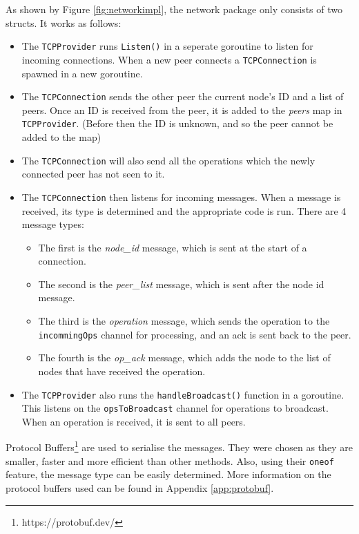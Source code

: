 \documentclass[12pt]{report}
\begin{document}
As shown by Figure \ref{fig:networkimpl}, the network package only consists of two structs. It works as follows: 
\begin{itemize}
    \item The \texttt{TCPProvider} runs \texttt{Listen()} in a seperate goroutine to listen for incoming connections. When a new peer connects a \texttt{TCPConnection} is spawned in a new goroutine.
    \item The \texttt{TCPConnection} sends the other peer the current node's ID and a list of peers. Once an ID is received from the peer, it is added to the \textit{peers} map in \texttt{TCPProvider}. (Before then the ID is unknown, and so the peer cannot be added to the map)
    \item The \texttt{TCPConnection} will also send all the operations which the newly connected peer has not seen to it.
    \item The \texttt{TCPConnection} then listens for incoming messages. When a message is received, its type is determined and the appropriate code is run. There are 4 message types:
    \begin{itemize}
        \item The first is the \textit{node\_id} message, which is sent at the start of a connection. 
        \item The second is the \textit{peer\_list} message, which is sent after the node id message. 
        \item The third is the \textit{operation} message, which sends the operation to the \texttt{incommingOps} channel for processing, and an ack is sent back to the peer.
        \item The fourth is the \textit{op\_ack} message, which adds the node to the list of nodes that have received the operation.
    \end{itemize} 
    \item The \texttt{TCPProvider} also runs the \texttt{handleBroadcast()} function in a goroutine. This listens on the \texttt{opsToBroadcast} channel for operations to broadcast. When an operation is received, it is sent to all peers. 
\end{itemize}
Protocol Buffers\footnote{https://protobuf.dev/} are used to serialise the messages. They were chosen as they are smaller, faster and more efficient than other methods. Also, using their \texttt{oneof} feature, the message type can be easily determined. More information on the protocol buffers used can be found in Appendix \ref{app:protobuf}. \par
\end{document}
